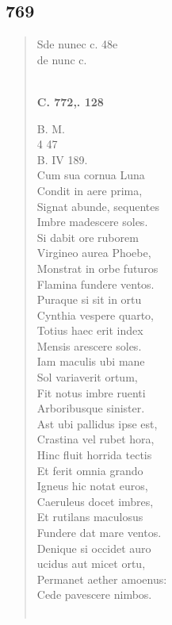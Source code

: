 \documentclass[11pt, a4paper]{report}
\begin{document}
            \subsection*{769}
      \begin{verse}
      Sde nunec c. 48e \\ de nunc c. \\ 
        ﻿\pagebreak 
     \marginpar{[254]} \begin{center} \textbf{C. 772,. 128} \end{center}B. M. \\ 4 47 \\ B. IV 189. \\ Cum sua cornua Luna \\ Condit in aere prima, \\ Signat abunde, sequentes \\ Imbre madescere soles. \\ Si dabit ore ruborem \\ Virgineo aurea Phoebe, \\ Monstrat in orbe futuros \\ Flamina fundere ventos. \\ Puraque si sit in ortu \\ Cynthia vespere quarto, \\ Totius haec erit index \\ Mensis arescere soles. \\ Iam maculis ubi mane \\ Sol variaverit ortum, \\ Fit notus imbre ruenti \\ Arboribusque sinister. \\ Ast ubi pallidus ipse est, \\ Crastina vel rubet hora, \\ Hinc fluit horrida tectis \\ Et ferit omnia grando \\ Igneus hic notat euros, \\ Caeruleus docet imbres, \\ Et rutilans maculosus \\ Fundere dat mare ventos. \\ Denique si occidet auro \\ ucidus aut micet ortu, \\ Permanet aether amoenus: \\ Cede pavescere nimbos. \\ 
        ﻿\pagebreak 

\end{verse}
\end{document}
